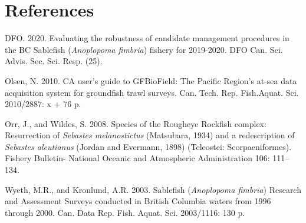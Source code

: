 \documentclass[12pt]{article}\usepackage[]{graphicx}\usepackage[]{color}
\begin{document}
\clearpage

\hypertarget{references}{%
\section{References}\label{references}}

\noindent \vspace{-2em} \setlength{\parindent}{-0.2in} \setlength{\leftskip}{0.2in} \setlength{\parskip}{8pt}

\hypertarget{refs}{}
\begin{CSLReferences}{1}{0}
%
DFO. 2020. Evaluating the robustness of candidate management procedures in the {BC} {S}ablefish ({\emph{Anoplopoma fimbria}}) fishery for 2019-2020. DFO Can. Sci. Advis. Sec. Sci. Resp. (25).

%
Olsen, N. 2010. CA user's guide to {GFBioField: The Pacific Region's} at-sea data acquisition system for groundfish trawl surveys. Can. Tech. Rep. Fish.Aquat. Sci. 2010/2887: x + 76 p.

%
Orr, J., and Wildes, S. 2008. Species of the {R}ougheye {R}ockfish complex: {R}esurrection of {\emph{Sebastes melanostictus}} ({M}atsubara, 1934) and a redescription of {\emph{Sebastes aleutianus}} ({J}ordan and {E}vermann, 1898) ({T}eleostei: {S}corpaeniformes). Fishery Bulletin- National Oceanic and Atmospheric Administration 106: 111--134.

%
Wyeth, M.R., and Kronlund, A.R. 2003. Sablefish ({\emph{Anoplopoma fimbria}}) {Research and Assessment Surveys} conducted in {British Columbia} waters from 1996 through 2000. Can. Data Rep. Fish. Aquat. Sci. 2003/1116: 130 p.

\end{CSLReferences}
\end{document}

